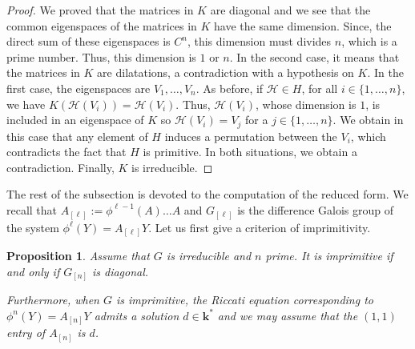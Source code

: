\documentclass[a4paper,11pt]{amsart}
\newtheorem{prop}[thm]{Proposition}
\def\k{\mathbf{k}}
\begin{document}
\begin{proof}
We proved that the matrices in $K$ are diagonal and we see that the common eigenspaces of the matrices in $K$ have the same dimension. Since, the direct sum of these eigenspaces is $C^n$, this dimension must divides $n$, which is a prime number. Thus, this dimension is $1$ or $n$. In the second case, it means that the matrices in $K$ are dilatations, a contradiction with a hypothesis on $K$. In the first case, the eigenspaces are $V_1,\ldots,V_n$. As before, if $\mathscr{H}\in H$, for all $i\in\lbrace 1,\ldots,n\rbrace$, we have $K(\mathscr{H}(V_i))=\mathscr{H}(V_i)$. Thus, $\mathscr{H}(V_i)$, whose  dimension is $1$, is included in an eigenspace of $K$ so  $\mathscr{H}(V_i)=V_j$ for a $j\in\lbrace 1,\ldots,n\rbrace$. We obtain in this case that any element of $H$ induces a permutation between the $V_i$, which contradicts the fact that $H$ is primitive. In both situations, we obtain a contradiction. Finally, $K$ is irreducible. 
\end{proof}





The rest of the subsection is devoted to the computation of the reduced form.
We recall that $A_{[\ell]}:=\phi^{\ell-1}(A)\dots A$ and $G_{[\ell]}$ is the difference Galois group of the system $\phi^{\ell}(Y)=A_{[\ell]}Y$.  Let us first give a criterion of imprimitivity.

  \begin{prop}\label{prop1}
 Assume that $G$ is irreducible and $n$ prime.  It is imprimitive if and only if $G_{[n]}$ is  diagonal. \par 
 Furthermore,  when   $G$ is imprimitive,   the Riccati equation corresponding to $\phi^n (Y)=A_{[n]}Y$ admits a solution    $d\in \k^*$ and we may assume that the $(1,1)$ entry of $A_{[n]}$ is $d$.  
 \end{prop} 
 
\end{document}
